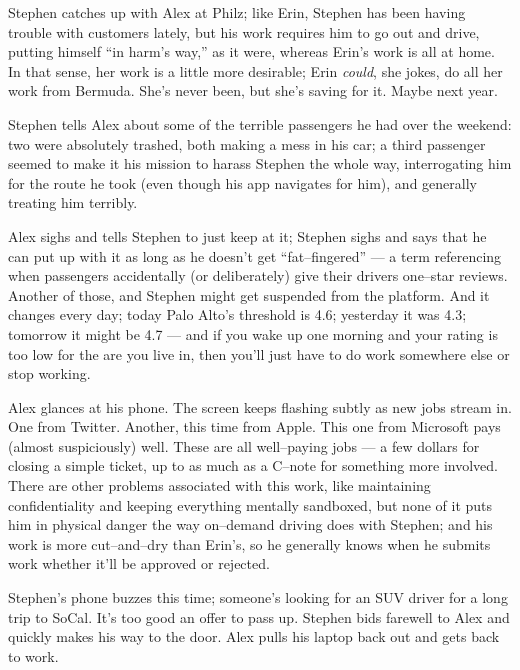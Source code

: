 \documentclass[10pt]{article}
\begin{document}
Stephen catches up with Alex at Philz;
like Erin, Stephen has been having trouble with customers lately, but his work
requires him to go out and drive, putting himself ``in harm's way,'' as it were,
whereas Erin's work is all at home.
In that sense, her work is a little more desirable;
Erin \textit{could}, she jokes, do all her work from Bermuda.
She's never been, but she's saving for it. Maybe next year.

Stephen tells Alex about some of the terrible passengers he had over the weekend:
two were absolutely trashed, both making a mess in his car;
a third passenger seemed to make it his mission to harass Stephen the whole way,
interrogating him for the route he took (even though his app navigates for him),
and generally treating him terribly.

Alex sighs and tells Stephen to just keep at it; 
Stephen sighs and says that he can put up with it as long as he doesn't get ``fat--fingered''
--- a term referencing when passengers accidentally (or deliberately) give their drivers one--star reviews.
Another of those, and Stephen might get suspended from the platform.
And it changes every day; today Palo Alto's threshold is 4.6; yesterday it was 4.3; tomorrow it might be 4.7
--- and if you wake up one morning and your rating is too low for the are you live in,
then you'll just have to do work somewhere else or stop working.

Alex glances at his phone.
The screen keeps flashing subtly as new jobs stream in.
One from Twitter.
Another, this time from Apple.
This one from Microsoft pays (almost suspiciously) well.
These are all well--paying jobs
--- a few dollars for closing a simple ticket, up to as much as a C--note for something more involved.
There are other problems associated with this work,
like maintaining confidentiality and keeping everything mentally sandboxed, 
but none of it puts him in physical danger the way on--demand driving does with Stephen;
and his work is more cut--and--dry than Erin's,
so he generally knows when he submits work whether it'll be approved or rejected.

Stephen's phone buzzes this time;
someone's looking for an SUV driver for a long trip to SoCal.
It's too good an offer to pass up.
Stephen bids farewell to Alex and quickly makes his way to the door.
Alex pulls his laptop back out and gets back to work.



\end{document}
